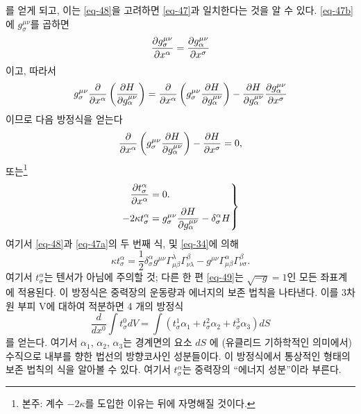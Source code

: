 를 얻게 되고, 이는 \eqref{eq-48}을 고려하면 \eqref{eq-47}과 일치한다는 것을 알 수 있다.
\eqref{eq-47b}에 $g_\sigma^{\mu\nu}$를 곱하면
\begin{equation*}
	{\frac{{\partial}{g_\sigma^{\mu\nu}}}{{\partial}{x^\alpha}}}={\frac{{\partial}{g_\alpha^{\mu\nu}}}{{\partial}{x^\sigma}}}
\end{equation*}
이고, 따라서
\begin{equation*}
	g_\sigma^{\mu\nu} {\frac{{\partial}{}}{{\partial}{x^\alpha}}}\left({\frac{{\partial}{H}}{{\partial}{g_\alpha^{\mu\nu}}}}\right)
	= {\frac{{\partial}{}}{{\partial}{x^\alpha}}}\left(g_\sigma^{\mu\nu} {\frac{{\partial}{H}}{{\partial}{g_\alpha^{\mu\nu}}}}\right)
	- {\frac{{\partial}{H}}{{\partial}{g_\alpha^{\mu\nu}}}} {\frac{{\partial}{g_\alpha^{\mu\nu}}}{{\partial}{x^\sigma}}}
\end{equation*}
이므로 다음 방정식을 얻는다
\begin{equation*}
	{\frac{{\partial}{}}{{\partial}{x^\alpha}}}\left(g_\sigma^{\mu\nu} {\frac{{\partial}{H}}{{\partial}{g_\alpha^{\mu\nu}}}}\right)
	- {\frac{{\partial}{H}}{{\partial}{x^\sigma}}} = 0,
\end{equation*}
또는\footnote{본주: 계수 $-2\kappa$를 도입한 이유는 뒤에 자명해질 것이다.}
\begin{equation} \label{eq-49}
	\left.
	\begin{aligned}
		{\frac{{\partial}{t_\sigma^\alpha}}{{\partial}{x^\alpha}}}&=0.\\
		-2\kappa t_\sigma^\alpha &= g_\sigma^{\mu\nu} {\frac{{\partial}{H}}{{\partial}{g_\alpha^{\mu\nu}}}}-\delta_\sigma^\alpha H
	\end{aligned}
	\right\}
\end{equation}
여기서 \eqref{eq-48}과 \eqref{eq-47a}의 두 번째 식, 및 \eqref{eq-34}에 의해
\begin{equation} \label{eq-50}
	\kappa t_\sigma^\alpha
	= \frac{1}{2}\delta_\sigma^\alpha g^{\mu\nu} \Gamma_{\mu\beta}^\lambda \Gamma_{\nu\lambda}^\beta
	- g^{\mu\nu} \Gamma_{\mu\beta}^\alpha \Gamma_{\nu\sigma}^\beta .
\end{equation}
여기서 $t_\sigma^\alpha$는 텐서가 아님에 주의할 것; 다른 한 편 \eqref{eq-49}는 $\sqrt{-g}=1$인 모든 좌표계에 적용된다. 이 방정식은 중력장의 운동량과 에너지의 보존 법칙을 나타낸다. 이를 3차원 부피 V에 대하여 적분하면 4 개의 방정식
\begin{equation} \tag{49a} \label{eq-49a}
	\frac{d}{dx^0}\int t_\sigma^0 dV = \int(t_\sigma^1 \alpha_1 + t_\sigma^2 \alpha_2 + t_\sigma^3 \alpha_3)dS
\end{equation}
를 얻는다. 여기서 $\alpha_1$, $\alpha_2$, $\alpha_3$는 경계면의 요소 $dS$ 에 (유클리드 기하학적인 의미에서) 수직으로 내부를 향한 법선의 방향코사인 성분들이다.
이 방정식에서 통상적인 형태의 보존 법칙의 식을 알아볼 수 있다. 여기서 $t_\sigma^\alpha$는 중력장의 ``에너지 성분''이라 부른다.

